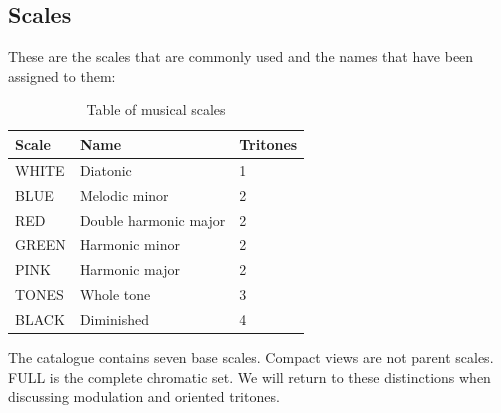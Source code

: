 \documentclass[]{report}
\begin{document}
\subsection{Scales}
These are the scales that are commonly used and the names that have been assigned to them:
\begin{table}[H]
\centering
\small
\begin{tabular}{lll}
\toprule
\textbf{\textsf{Scale}} & \textbf{Name} & \textbf{Tritones} \\
\midrule
\textsf{WHITE} & Diatonic & 1 \\
\textsf{BLUE} & Melodic minor & 2 \\
\textsf{RED} & Double harmonic major & 2 \\
\textsf{GREEN} & Harmonic minor & 2 \\
\textsf{PINK} & Harmonic major & 2 \\
\textsf{TONES} & Whole tone & 3 \\
\textsf{BLACK} & Diminished & 4 \\
\bottomrule
\end{tabular}
\caption{Table of musical scales}\label{tab:scale-name-equivalences}
\end{table}

The catalogue contains seven base scales. Compact views are not parent scales.
\textsf{FULL} is the complete chromatic set. We will return to these
distinctions when discussing modulation and oriented tritones.
\end{document}
